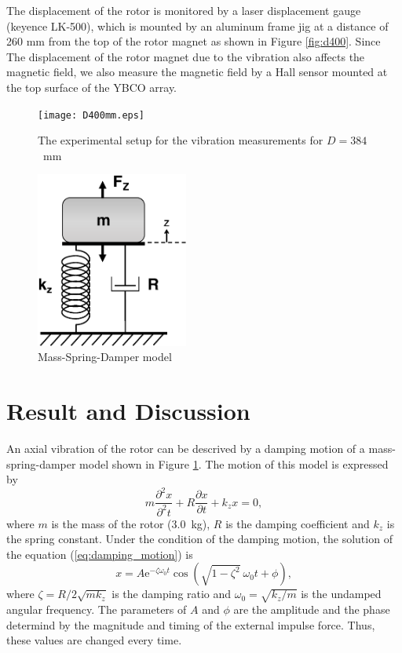 \documentclass[a4paper]{jpconf}
\begin{document}
The displacement of the rotor is monitored by a laser displacement gauge (keyence LK-500),
which is mounted by an aluminum frame jig at a distance of 260 mm from the top of the rotor magnet as shown in Figure \ref{fig:d400}.
Since The displacement of the rotor magnet due to the vibration also affects the magnetic field,
we also measure the magnetic field by a Hall sensor mounted at the top surface of the YBCO array.

\begin{figure}[htbp]
  \centering
  \begin{minipage}{0.6\hsize}
    \texttt{[image: D400mm.eps]}
    \caption{The experimental setup for the vibration measurements for $D=384$~mm}
    \label{fig:d400}
  \end{minipage}
  \begin{minipage}{0.3\hsize}
    \centering
    \includegraphics[width=50mm]{SpringSystem.eps}
    \caption{Mass-Spring-Damper model}
    \label{fig:msd}
  \end{minipage}
\end{figure}


\section*{Result and Discussion}

An axial vibration of the rotor can be descrived by a damping motion of a mass-spring-damper model shown in Figure \ref{fig:msd}.
The motion of this model is expressed by
\begin{equation}
  m \frac{\partial^{2} x}{\partial^{2} t} + R \frac{\partial x}{\partial t} + k_{z} x = 0,
  \label{eq:damping_motion}
\end{equation}
where $m$ is the mass of the rotor (3.0~kg), $R$ is the damping coefficient and $k_{z}$ is the spring constant.
Under the condition of the damping motion, the solution of the equation (\ref{eq:damping_motion}) is
\begin{equation}
  x = A \mathrm{e}^{- \zeta \omega_{0} t} \cos( \sqrt{1 - \zeta^{2}} \ \omega_{0} t + \phi),
  \label{eq:damping}
\end{equation}
where $\zeta = R / 2 \sqrt{mk_{z}}$ is the damping ratio and $\omega_{0} = \sqrt{k_{z}/m}$ is the undamped angular frequency.
The parameters of $A$ and $\phi$ are the amplitude and the phase determind by the magnitude and timing of the external impulse force.
Thus, these values are changed every time.
\end{document}
